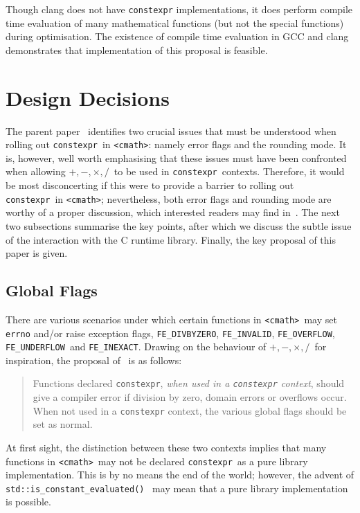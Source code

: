\documentclass[prd,twocolumn,amsmath,amssymb,nofootinbib,eqsecnum]{revtex4-1}
\newcommand{\constexpr}{\code{constexpr}\xspace}
\newcommand{\code}[1]{{\tt #1}}
\newcommand{\header}[1]{{\tt <#1>}}
\newcommand{\cmath}{\header{cmath}}
\newcommand{\FEINVALID}{{\tt FE\_INVALID}}
\newcommand{\FEDIVBYZERO}{{\tt FE\_DIVBYZERO}}
\newcommand{\FEINEXACT}{{\tt FE\_INEXACT}}
\newcommand{\FEUNDERFLOW}{{\tt FE\_UNDERFLOW}}
\newcommand{\FEOVERFLOW}{{\tt FE\_OVERFLOW}}
\newcommand{\Operators}{\ensuremath{+,-,\times,/}}
\begin{document}
Though clang does not have \constexpr implementations, it does perform compile time evaluation of many mathematical functions (but not the special functions) during optimisation. The existence of compile time evaluation in GCC and clang demonstrates that implementation of this proposal is feasible.


\section{Design Decisions}

The parent paper~\cite{Rosten-constexpr} identifies two crucial issues that must be understood when rolling out \constexpr\ in \cmath: namely error flags and the rounding mode. It is, however, well worth emphasising that these issues must have been confronted when allowing \Operators\ to be used in \constexpr\ contexts. Therefore, it would be most disconcerting if this were to provide a barrier to rolling out \constexpr\ in \cmath; nevertheless, both error flags and rounding mode are worthy of a proper discussion, which interested readers may find in~\cite{Rosten-constexpr}. The next two subsections summarise the key points, after which we discuss the subtle issue of the interaction with the C runtime library. Finally, the key proposal of this paper is given.

\subsection{Global Flags}

There are various scenarios under which certain functions in \cmath\ may set \code{errno} and/or raise exception flags, \FEDIVBYZERO, \FEINVALID, \FEOVERFLOW, \FEUNDERFLOW\ and
\FEINEXACT. Drawing on the behaviour of \Operators\ for inspiration, the proposal of~\cite{Rosten-constexpr} is as follows:
\begin{quotation}
	Functions declared \constexpr, \emph{when used in a \constexpr
context}, should give a compiler error if division by zero, domain errors or
overflows occur. When not used in a \constexpr context, the various global
flags should be set as normal.
\end{quotation}
At first sight, the distinction between these two contexts implies that many functions in \cmath\ may not be declared \constexpr\ as a pure library implementation. This is by no means the end of the world; however, the advent of \code{std::is\_constant\_evaluated()}~\cite{ConstEval}
may mean that a pure library implementation is possible.
\end{document}
